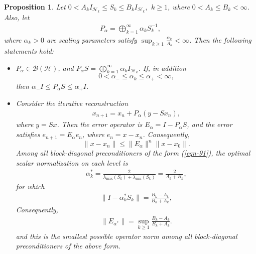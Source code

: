 \documentclass[10pt,a4paper]{amsart}
\newtheorem{prop}[thm]{Proposition}
\begin{document}
\begin{prop} \label{Prop.22}
Let $0<A_k I_{\mathcal H_k} \leq S_k \leq B_k I_{\mathcal H_k},
\,\ k\geq 1$, where $0<A_k\leq B_k<\infty $. Also, let
\begin{eqnarray} \label{eqn-91}
P_{\alpha} = \bigoplus_{k=1}^{\infty}\alpha_k S_k^{-1},
\end{eqnarray}
where $\alpha_k>0$ are scaling parameters satisfy
$\sup_{k\ge1}\frac{\alpha_k}{A_k}<\infty$. Then the following
statements hold:
\begin{itemize}
\item[(i)] $P_{\alpha}\in\mathcal B(\mathcal H)$, and $P_\alpha S
= \bigoplus_{k=1}^{\infty}\alpha_k I_{\mathcal H_k}$. If, in
addition $$0<\alpha_- \leq \alpha_k\leq \alpha_+<\infty ,$$ then
$\alpha_- I \leq P_\alpha S \leq \alpha_+ I$. \item[(ii)] Consider
the iterative reconstruction
\begin{eqnarray} \label{eqn-92}
x_{n+1} = x_n+ P_\alpha(y-Sx_n),
\end{eqnarray}
where $y=Sx$. Then the error operator is $E_\alpha = I-P_\alpha
S$, and the error satisfies $e_{n+1} = E_\alpha e_n$, where
$e_n=x-x_n$. Consequently,
$$\|x-x_n\| \leq \|E_\alpha\|^n\|x-x_0\|.$$
Among all block-diagonal preconditioners of the form
(\ref{eqn-91}), the optimal scalar normalization on each level is
\begin{eqnarray*}
\alpha_k^{*} = \frac{2} {\lambda_{\max}(S_k)+\lambda_{\min}(S_k)}=
\frac{2}{A_k+B_k},
\end{eqnarray*}
for which
\begin{eqnarray*}
\|I-\alpha_k^{*}S_k\| = \frac{B_k-A_k}{B_k+A_k},
\end{eqnarray*}
Consequently,
\begin{eqnarray*}
\|E_{\alpha^*}\| = \sup_{k\geq1} \frac{B_k-A_k}{B_k+A_k}.
\end{eqnarray*}
and this is the smallest possible operator norm among all
block-diagonal preconditioners of the above form.
\end{itemize}
\end{prop}
\end{document}
